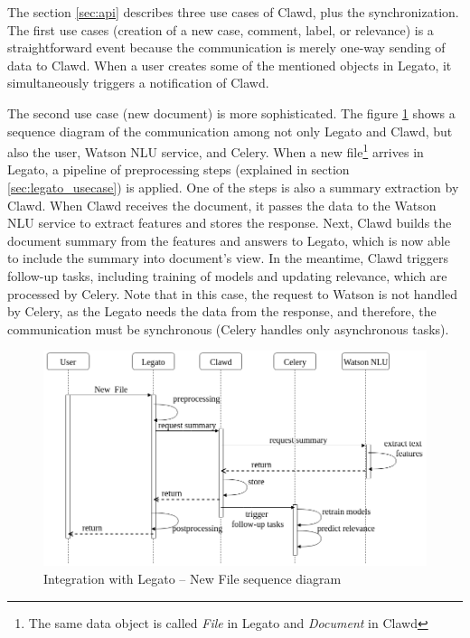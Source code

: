 \documentclass[
  digital, %
  notable,   %
  nolof,     %
  nolot,     %
]{fithesis3}
\begin{document}
The section \ref{sec:api} describes three use cases of Clawd, plus the synchronization.
The first use cases (creation of a new case, comment, label, or relevance) is a straightforward event because the communication is merely one-way sending of data to Clawd.
When a user creates some of the mentioned objects in Legato, it simultaneously triggers a notification of Clawd.

The second use case (new document) is more sophisticated.
The figure \ref{fig:integration_new_file} shows a sequence diagram of the communication among not only Legato and Clawd, but also the user, Watson NLU service, and Celery.
When a new file\footnote{The same data object is called \textit{File} in Legato and \textit{Document} in Clawd} arrives in Legato, a pipeline of preprocessing steps (explained in section \ref{sec:legato_usecase}) is applied.
One of the steps is also a summary extraction by Clawd.
When Clawd receives the document, it passes the data to the Watson NLU service to extract features and stores the response.
Next, Clawd builds the document summary from the features and answers to Legato, which is now able to include the summary into document's view.
In the meantime, Clawd triggers follow-up tasks, including training of models and updating relevance, which are processed by Celery.
Note that in this case, the request to Watson is not handled by Celery, as the Legato needs the data from the response, and therefore, the communication must be synchronous (Celery handles only asynchronous tasks).

\begin{figure}[h]
\caption{Integration with Legato -- New File sequence diagram}
\label{fig:integration_new_file}
\includegraphics[width=\textwidth]{img/integration_new_file}
\end{figure}
\end{document}
